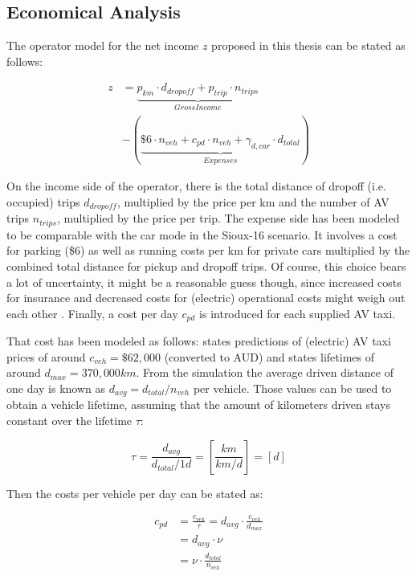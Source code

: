 \subsection{Economical Analysis}
\label{sec:economics}

The operator model for the net income $z$ proposed in this thesis can be stated as follows:

\begin{equation}\begin{aligned}
z
&= \underbrace{p_{km} \cdot d_{dropoff} + p_{trip} \cdot n_{trips}}_{Gross Income}\\
&- \left( \underbrace{\$6 \cdot n_{veh} + c_{pd} \cdot n_{veh} + \gamma_{d,car} \cdot d_{total}}_{Expenses} \right)
\label{eq:step1}
\end{aligned}\end{equation}

On the income side of the operator, there is the total distance of dropoff (i.e.
occupied) trips $d_{dropoff}$, multiplied by the price per km and the number
of AV trips $n_{trips}$, multiplied by the price per trip. The expense side has
been modeled to be comparable with the car mode in the Sioux-16 scenario. It involves
a cost for parking (\$6) as well as running costs per km for private cars multiplied by the combined
total distance for pickup and dropoff trips. Of course, this choice bears a lot
of uncertainty, it might be a reasonable guess though, since increased costs for
insurance and decreased costs for (electric) operational costs might weigh out
each other \citep{Chen15}. Finally, a cost per day
$c_{pd}$ is introduced for each supplied AV taxi.

That cost has been modeled as follows:  states predictions of
(electric) AV taxi prices of around $c_{veh} = \$62,000$ (converted to AUD) and states lifetimes
of around $d_{max} = 370,000 km$. From the simulation the average driven distance
of one day is known as $d_{avg} = d_{total} / n_{veh}$ per vehicle. Those values can
be used to obtain a vehicle lifetime, assuming that the amount of kilometers
driven stays constant over the lifetime $\tau$:

\begin{equation}
\tau = \frac{d_{avg}}{d_{total} / 1d} = \left[ \frac{km}{km/d} \right] = [d]
\end{equation}

Then the costs per vehicle per day can be stated as:

\begin{equation}\begin{aligned}
c_{pd} &= \frac{c_{veh}}{\tau} = d_{avg} \cdot \frac{c_{veh}}{d_{max}} \\
&= d_{avg} \cdot \nu\\
&= \nu \cdot \frac{d_{total}}{n_{veh}}
\end{aligned}\end{equation}

